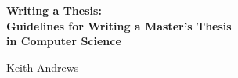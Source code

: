 %
%
% 
% 
% 




\vspace*{2cm}


\begin{center}
\begin{spacing}{1.1}
\Huge\sffamily\bfseries
Writing a Thesis:\\
Guidelines for Writing a Master's Thesis\\
in Computer Science
\end{spacing}

\vspace{3cm}


\vspace{3cm}

{\LARGE\sffamily
Keith Andrews
}
\end{center}








\cleardoublepage


\vspace*{-3cm}

